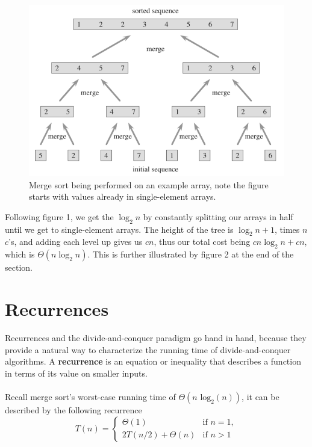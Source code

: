 \documentclass{article}
\begin{document}
\begin{figure}[ht]
\centering
\includegraphics[scale=0.5]{merge}
\caption{
    Merge sort being performed on an example array, note the figure starts with values already in single-element arrays.
}
\label{fig:merge_sort}
\end{figure}

Following figure 1, we get the $\log_2{n}$ by constantly splitting our arrays in half until we get to single-element arrays. The height of the tree is $\log_2{n} + 1$, times $n$ $c$'s, and adding each level up gives us $cn$, thus our total cost being $cn \log_2{n} + cn$, which is $\Theta{(n \log_2 n)}$. This is further illustrated by figure 2 at the end of the section.

\newpage

\section*{Recurrences}
Recurrences and the divide-and-conquer paradigm go hand in hand, because they provide a natural way to characterize the running time of divide-and-conquer algorithms. A \textbf{recurrence} is an equation or inequality that describes a function in terms of its value on smaller inputs. 
\\ \\
Recall merge sort's worst-case running time of $\Theta{(n\text{ log}_2(n))}$, it can be described by the following recurrence\\
$$
T(n)=
\begin{cases}
\Theta(1) & \text{if } n = 1,\\
2T(n/2) + \Theta{(n)} & \text{if } n > 1
\end{cases}
$$
\end{document}
